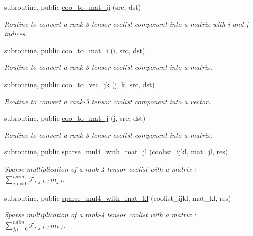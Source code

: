 \begin{DoxyCompactItemize}
subroutine, public \hyperlink{namespacetensor_af104cb6f7354f1465eb53e0f3738a3d0}{coo\+\_\+to\+\_\+mat\+\_\+ij} (src, dst)
\begin{DoxyCompactList}\small\item\em Routine to convert a rank-\/3 tensor coolist component into a matrix with i and j indices. \end{DoxyCompactList}\item 
subroutine, public \hyperlink{namespacetensor_ac77bcc80d4bd189835b88db68ffafda4}{coo\+\_\+to\+\_\+mat\+\_\+i} (i, src, dst)
\begin{DoxyCompactList}\small\item\em Routine to convert a rank-\/3 tensor coolist component into a matrix. \end{DoxyCompactList}\item 
subroutine, public \hyperlink{namespacetensor_abb370166c0ebd0885404c1703d464f89}{coo\+\_\+to\+\_\+vec\+\_\+jk} (j, k, src, dst)
\begin{DoxyCompactList}\small\item\em Routine to convert a rank-\/3 tensor coolist component into a vector. \end{DoxyCompactList}\item 
subroutine, public \hyperlink{namespacetensor_a2088d80a587fd931ca64976a87403401}{coo\+\_\+to\+\_\+mat\+\_\+j} (j, src, dst)
\begin{DoxyCompactList}\small\item\em Routine to convert a rank-\/3 tensor coolist component into a matrix. \end{DoxyCompactList}\item 
subroutine, public \hyperlink{namespacetensor_aae291b0fab419ce7692da1933105e9ae}{sparse\+\_\+mul4\+\_\+with\+\_\+mat\+\_\+jl} (coolist\+\_\+ijkl, mat\+\_\+jl, res)
\begin{DoxyCompactList}\small\item\em Sparse multiplication of a rank-\/4 tensor coolist with a matrix \+: ${\displaystyle \sum_{j,l=0}^{ndim}} \mathcal{T}_{i,j,k,l} \, m_{j,l} $. \end{DoxyCompactList}\item 
subroutine, public \hyperlink{namespacetensor_af65ad5ae657ecd97f70109b2c273696b}{sparse\+\_\+mul4\+\_\+with\+\_\+mat\+\_\+kl} (coolist\+\_\+ijkl, mat\+\_\+kl, res)
\begin{DoxyCompactList}\small\item\em Sparse multiplication of a rank-\/4 tensor coolist with a matrix \+: ${\displaystyle \sum_{j,l=0}^{ndim}} \mathcal{T}_{i,j,k,l} \, m_{k,l} $. \end{DoxyCompactList}\item 

\end{DoxyCompactItemize}
